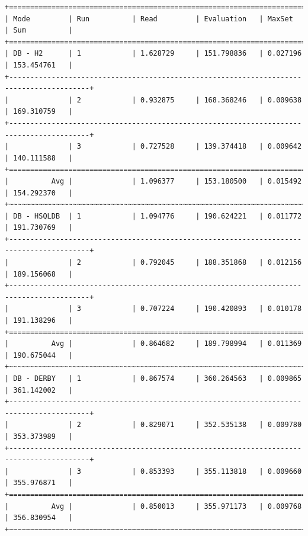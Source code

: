 \documentclass[draft,final]{vutinfth} %
\begin{document}
\begin{lstlisting}[basicstyle=\tiny,caption={Benchmark DB \textbf{ohne} Indizes, Datei: lubm-ex-20-17.sparql.xml},label={lst:dboi17}]
+=========================================================================================+
| Mode         | Run          | Read         | Evaluation   | MaxSet       | Sum          | 
+=========================================================================================+
| DB - H2      | 1            | 1.628729     | 151.798836   | 0.027196     | 153.454761   | 
+-----------------------------------------------------------------------------------------+
|              | 2            | 0.932875     | 168.368246   | 0.009638     | 169.310759   | 
+-----------------------------------------------------------------------------------------+
|              | 3            | 0.727528     | 139.374418   | 0.009642     | 140.111588   | 
+=========================================================================================+
|          Avg |              | 1.096377     | 153.180500   | 0.015492     | 154.292370   | 
+~~~~~~~~~~~~~~~~~~~~~~~~~~~~~~~~~~~~~~~~~~~~~~~~~~~~~~~~~~~~~~~~~~~~~~~~~~~~~~~~~~~~~~~~~+
| DB - HSQLDB  | 1            | 1.094776     | 190.624221   | 0.011772     | 191.730769   | 
+-----------------------------------------------------------------------------------------+
|              | 2            | 0.792045     | 188.351868   | 0.012156     | 189.156068   | 
+-----------------------------------------------------------------------------------------+
|              | 3            | 0.707224     | 190.420893   | 0.010178     | 191.138296   | 
+=========================================================================================+
|          Avg |              | 0.864682     | 189.798994   | 0.011369     | 190.675044   | 
+~~~~~~~~~~~~~~~~~~~~~~~~~~~~~~~~~~~~~~~~~~~~~~~~~~~~~~~~~~~~~~~~~~~~~~~~~~~~~~~~~~~~~~~~~+
| DB - DERBY   | 1            | 0.867574     | 360.264563   | 0.009865     | 361.142002   | 
+-----------------------------------------------------------------------------------------+
|              | 2            | 0.829071     | 352.535138   | 0.009780     | 353.373989   | 
+-----------------------------------------------------------------------------------------+
|              | 3            | 0.853393     | 355.113818   | 0.009660     | 355.976871   | 
+=========================================================================================+
|          Avg |              | 0.850013     | 355.971173   | 0.009768     | 356.830954   | 
+~~~~~~~~~~~~~~~~~~~~~~~~~~~~~~~~~~~~~~~~~~~~~~~~~~~~~~~~~~~~~~~~~~~~~~~~~~~~~~~~~~~~~~~~~+
\end{lstlisting}
\end{document}
